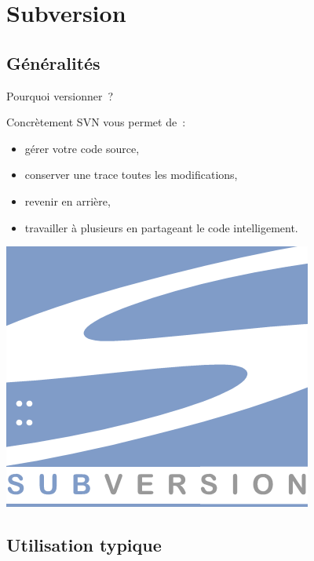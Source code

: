 
\section{Subversion}

\subsection{Généralités}
\begin{frame}{Pourquoi versionner~?}
  \begin{alertblock}{Concrètement}
    SVN vous permet de~:
    \begin{itemize}
      \item gérer votre code source,
      \item conserver une trace toutes les modifications,

      \item revenir en arrière,
      \item travailler à plusieurs en partageant le code intelligement.
    \end{itemize}
  \end{alertblock}
  \begin{center}
    \includegraphics[scale=3]{images/logo_svn}
  \end{center}
\end{frame}

\subsection{Utilisation typique}


